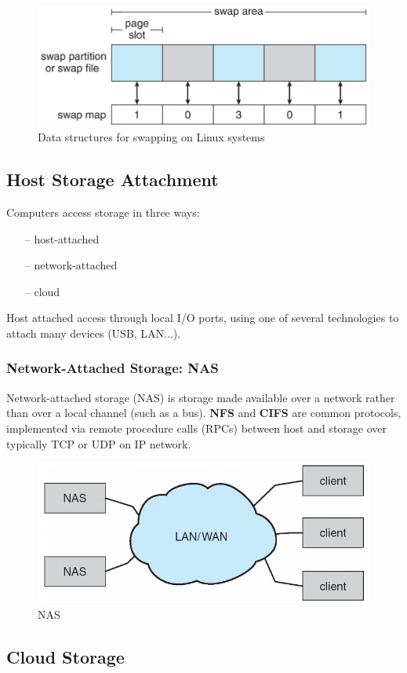\begin{figure}[h!]
    \centering
    \includegraphics[width=0.55\linewidth]{img/amrjkyt.png}
    \caption{Data structures for swapping on Linux systems}
\end{figure}


\newpage
\subsection{Host Storage Attachment}

Computers access storage in three ways:

\begin{itemize}
    \item[--] host-attached
    \item[--] network-attached
    \item[--] cloud
\end{itemize}

Host attached access through local I/O ports, using one of several
technologies to attach many devices (USB, LAN...).

\subsubsection{Network-Attached Storage: NAS}

Network-attached storage (NAS) is storage made available over a
network rather than over a local channel (such as a bus). \textbf{NFS} and \textbf{CIFS} are common protocols, implemented via remote procedure calls (RPCs) between host and
storage over typically TCP or UDP on IP network.

\begin{figure}[h!]
    \centering
    \includegraphics[width=0.5\linewidth]{img/tdmng.png}
    \caption{NAS}
\end{figure}

\subsection{Cloud Storage}


